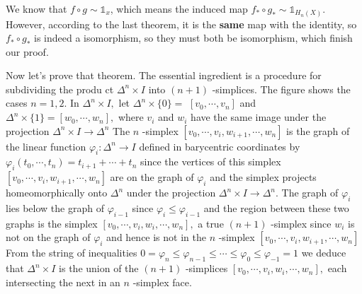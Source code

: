 \documentclass[]{ctexart}
\begin{document}
		We know that $f\circ g\sim \mathds{1}_x$, which means the induced map $f_*\circ g_*\sim \mathds{1}_{H_n(X)}$. However, according to the last theorem, it is the \textbf{same} map with the identity, so $f_*\circ g_*$ is indeed a isomorphism, so they must both be isomorphism, which finish our proof. 
		
		Now let's prove that theorem. The essential ingredient is a procedure for subdividing the produ ct $\Delta^{n} \times I$ into $(n+1)$ -simplices. The figure shows the cases $n=1,2 .$ In $\Delta^{n} \times I,$ let $\Delta^{n} \times\{0\}=$ $\left[v_{0}, \cdots, v_{n}\right]$ and $\Delta^{n} \times\{1\}=\left[w_{0}, \cdots, w_{n}\right],$ where $v_{i}$ and
		$w_{i}$ have the same image under the projection $\Delta^{n} \times I \rightarrow \Delta^{n}$ The $n$ -simplex $\left[v_{0}, \cdots, v_{i}, w_{i+1}, \cdots, w_{n}\right]$ is the graph of the linear function $\varphi_{i}: \Delta^{n} \rightarrow I$ defined in barycentric coordinates by $\varphi_{i}\left(t_{0}, \cdots, t_{n}\right)=t_{i+1}+\cdots+t_{n}$ since the
		vertices of this simplex $\left[v_{0}, \cdots, v_{i}, w_{i+1}, \cdots, w_{n}\right]$ are on the graph of $\varphi_{i}$ and the simplex projects homeomorphically onto $\Delta^{n}$ under the projection $\Delta^{n} \times I \rightarrow \Delta^{n} .$ The graph of $\varphi_{i}$ lies below the graph of $\varphi_{i-1}$ since $\varphi_{i} \leq \varphi_{i-1}$ and the region between these two graphs is the simplex $\left[v_{0}, \cdots, v_{i}, w_{i}, \cdots, w_{n}\right],$ a true $(n+1)$ -simplex since $w_{i}$ is not on the graph of $\varphi_{i}$ and hence is not in the $n$ -simplex $\left[v_{0}, \cdots, v_{i}, w_{i+1}, \cdots, w_{n}\right]$ From the string of inequalities $0=\varphi_{n} \leq \varphi_{n-1} \leq \cdots \leq \varphi_{0} \leq \varphi_{-1}=1$ we deduce that $\Delta^{n} \times I$ is the union of the $(n+1)$ -simplices $\left[v_{0}, \cdots, v_{i}, w_{i}, \cdots, w_{n}\right],$ each intersecting
		the next in an $n$ -simplex face.
\end{document}
